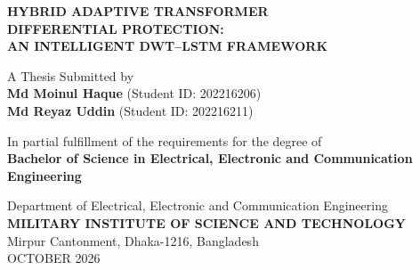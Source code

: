 \documentclass[12pt,a4paper,oneside]{report}
\begin{document}
\begin{titlepage}
\centering
\vspace*{0.6in}
{\LARGE\bfseries HYBRID ADAPTIVE TRANSFORMER\\[2pt] DIFFERENTIAL PROTECTION:\\[8pt] AN INTELLIGENT DWT--LSTM FRAMEWORK\par}
\vspace{1.5in}
{\large A Thesis Submitted by\\[8pt]
\textbf{Md Moinul Haque} (Student ID: 202216206)\\[3pt]
\textbf{Md Reyaz Uddin} (Student ID: 202216211)\par}
\vspace{0.8in}
{\large In partial fulfillment of the requirements for the degree of\\[6pt]
\textbf{Bachelor of Science in Electrical, Electronic and Communication Engineering}\par}
\vfill
{\large Department of Electrical, Electronic and Communication Engineering\\[4pt]
\textbf{MILITARY INSTITUTE OF SCIENCE AND TECHNOLOGY}\\[4pt]
Mirpur Cantonment, Dhaka-1216, Bangladesh\\[8pt]
OCTOBER 2026\par}
\end{titlepage}

\setcounter{page}{2}
\end{document}
